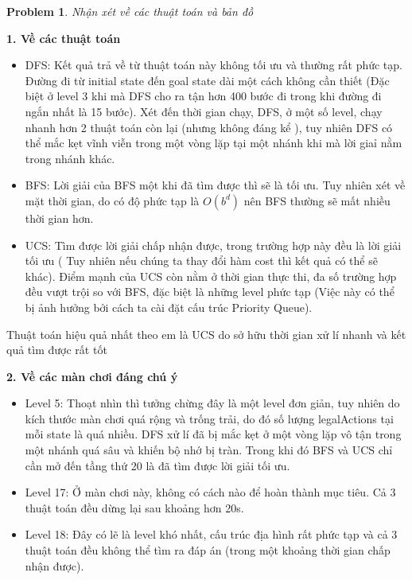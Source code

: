 \documentclass[12pt]{article}
\newtheorem{problem}{Problem}
\begin{document}
\begin{problem}
	Nhận xét về các thuật toán và bản đồ
\end{problem}
\hspace{-1em}\textbf{1. Về các thuật toán} 
\lstset{style=mystyle}

\begin{itemize}
	\item DFS: Kết quả trả về từ thuật toán này không tối ưu và thường rất phức tạp. Đường đi từ initial state đến goal state dài một cách không cần thiết (Đặc biệt ở level 3 khi mà DFS cho ra tận hơn 400 bước đi trong khi đường đi ngắn nhất là 15 bước). Xét đến thời gian chạy, DFS, ở một số level, chạy nhanh hơn 2 thuật toán còn lại (nhưng không đáng kể ), tuy nhiên DFS có thể mắc kẹt vĩnh viễn trong một vòng lặp tại một nhánh khi mà lời giaỉ nằm trong nhánh khác.
	\item BFS: Lời giải của BFS một khi đã tìm được thì sẽ là tối ưu. Tuy nhiên xét về mặt thời gian, do có độ phức tạp là $O(b^d)$ nên BFS thường sẽ mất nhiều thời gian hơn.
	\item UCS: Tìm được lời giải chấp nhận được, trong trường hợp này đều là lời giải tối ưu ( Tuy nhiên nếu chúng ta thay đổi hàm cost thì kết quả có thể sẽ khác). Điểm mạnh của UCS còn nằm ở thời gian thực thi, đa số trường hợp đều vượt trội so với BFS, đặc biệt là những level phức tạp (Việc này có thể bị ảnh hưởng bởi cách ta cài đặt cấu trúc Priority Queue).  
\end{itemize}
\begin{tcolorbox}[boxrule=0.5pt, colback=backcolour]
		Thuật toán hiệu quả nhất theo em là UCS do sở hữu thời gian xử lí nhanh và kết quả tìm được rất tốt
\end{tcolorbox}
\hspace{-1em}\textbf{2. Về các màn chơi đáng chú ý}
\begin{itemize}
	\item Level 5: Thoạt nhìn thì tưởng chừng đây là một level đơn giản, tuy nhiên do kích thước màn chơi quá rộng và trống trải, do đó số lượng legalActions tại mỗi state là quá nhiều. DFS xử lí đã bị mắc kẹt ở một vòng lặp vô tận trong một nhánh quá sâu và khiến bộ nhớ bị tràn. Trong khi đó BFS và UCS chỉ cần mở đến tầng thứ 20 là đã tìm được lời giải tối ưu.
	\item Level 17: Ở màn chơi này, không có cách nào để hoàn thành mục tiêu. Cả 3 thuật toán đều dừng lại sau khoảng hơn 20s.
	\item Level 18: Đây có lẽ là level khó nhất, cấu trúc địa hình rất phức tạp và cả 3 thuật toán đều không thể tìm ra đáp án (trong một khoảng thời gian chấp nhận được).
\end{itemize}
\end{document}
